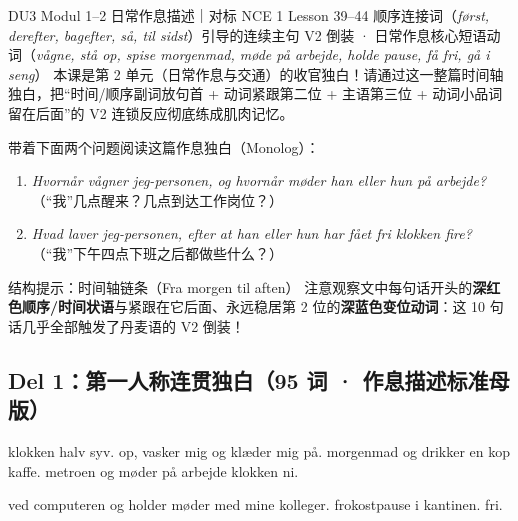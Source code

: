 {DU3 Modul 1--2 日常作息描述｜对标 NCE 1 Lesson 39--44}
{顺序连接词（\textit{først, derefter, bagefter, så, til sidst}）引导的连续主句 V2 倒装 · 日常作息核心短语动词（\textit{vågne, stå op, spise morgenmad, møde på arbejde, holde pause, få fri, gå i seng}）}
{本课是第 2 单元（日常作息与交通）的收官独白！请通过这一整篇时间轴独白，把“时间/顺序副词放句首 + 动词紧跟第二位 + 主语第三位 + 动词小品词留在后面”的 V2 连锁反应彻底练成肌肉记忆。}

\begin{foerduleaeser}
带着下面两个问题阅读这篇作息独白（Monolog）：
\begin{enumerate}
  \item \textit{Hvornår vågner jeg-personen, og hvornår møder han eller hun på arbejde?}（“我”几点醒来？几点到达工作岗位？）
  \item \textit{Hvad laver jeg-personen, efter at han eller hun har fået fri klokken fire?}（“我”下午四点下班之后都做些什么？）
\end{enumerate}
\end{foerduleaeser}


\begin{tipbox}{结构提示：时间轴链条（Fra morgen til aften）}
\small
注意观察文中每句话开头的\textbf{\color{NCDRed}深红色顺序/时间状语}与紧跟在它后面、永远稳居第 2 位的\textbf{\color{NCDNavy}深蓝色变位动词}：这 10 句话几乎全部触发了丹麦语的 V2 倒装！
\end{tipbox}

\subsection*{Del 1：第一人称连贯独白（95 词 · 作息描述标准母版）}

  klokken halv syv.   op, vasker mig og klæder mig på.   morgenmad og drikker en kop kaffe.   metroen og møder på arbejde klokken ni.

  ved computeren og holder møder med mine kolleger.   frokostpause i kantinen.   fri.

